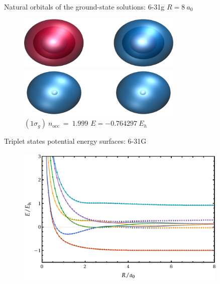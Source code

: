 \documentclass[10pt]{beamer}
\begin{document}
\begin{frame}{Natural orbitals of the ground-state solutions:  6-31g $R=8~a_0$}
\begin{figure}
\begin{columns}[b]
      \begin{column}{0.31\textwidth}
        \includegraphics[width=0.7\textwidth]{Figures/h2_r8_HF_mo4.cube.png}
        \caption*{\centering $(2\sigma_u)~n_\text{occ}~=~0.001$}
        \includegraphics[width=0.7\textwidth]{Figures/h2_r8_HF_mo1.cube.png}
        \caption*{\centering $(1\sigma_g)~n_\text{occ}~=~1.999$
          $E=-0.764297~E_h$}
      \end{column}
    
    \end{columns}
  \end{figure} 
\end{frame}

\begin{frame}{Triplet states potential energy surfaces:  6-31G}
  \begin{figure}
    \includegraphics[width=0.9\textwidth]{Figures/fig_6a.pdf}
  \end{figure}
\end{frame}
\end{document}
